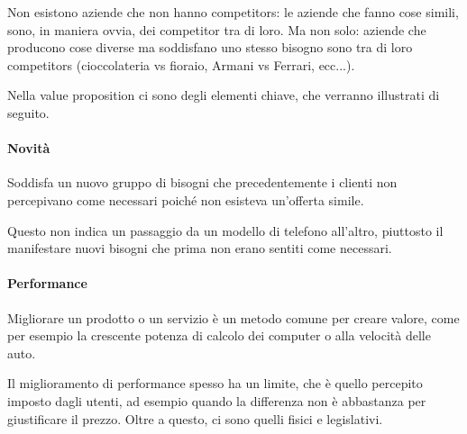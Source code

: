 Non esistono aziende che non hanno competitors: le aziende che fanno cose
simili, sono, in maniera ovvia, dei competitor tra di loro. Ma non solo:
aziende che producono cose diverse ma soddisfano uno stesso bisogno sono tra di
loro competitors (cioccolateria vs fioraio, Armani vs Ferrari, ecc...).

Nella value proposition ci sono degli elementi chiave, che verranno illustrati
di seguito.

\paragraph*{Novità} Soddisfa un nuovo gruppo di bisogni che precedentemente i
clienti non percepivano come necessari poiché non esisteva un'offerta simile.

Questo non indica un passaggio da un modello di telefono all'altro, piuttosto
il manifestare nuovi bisogni che prima non erano sentiti come necessari.

\paragraph*{Performance} Migliorare un prodotto o un servizio è un metodo
comune per creare valore, come per esempio la crescente potenza di calcolo dei
computer o alla velocità delle auto.

Il miglioramento di performance spesso ha un limite, che è quello percepito
imposto dagli utenti, ad esempio quando la differenza non è abbastanza per
giustificare il prezzo. Oltre a questo, ci sono quelli fisici e legislativi.
